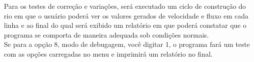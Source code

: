 \documentclass[11pt,a4paper]{article}
\begin{document}
Para os testes de correção e variações, será executado um ciclo de construção do rio em que o usuário poderá ver os valores gerados de velocidade e fluxo em cada linha e ao final do qual será exibido um relatório em que poderá constatar que o programa se comporta de maneira adequada sob condições normais.\\

Se para a opção 8, modo de debugagem, você digitar 1, o programa fará um teste com as opções carregadas no menu e imprimirá um relatório no final. 
\end{document}
